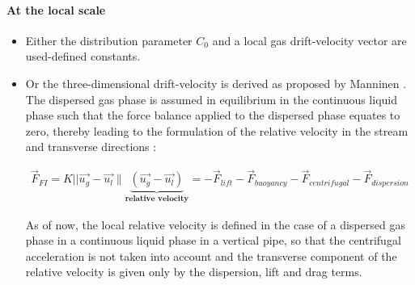 \paragraph{At the local scale} 
\begin{itemize}
	\item Either the distribution parameter $C_0$ and a local gas drift-velocity vector are used-defined constants. 
	\item Or the three-dimensional drift-velocity is derived as proposed by Manninen \cite{manninen1996mixture}. The dispersed gas phase  is assumed in equilibrium in the continuous liquid phase such that the force balance applied to the dispersed phase equates to zero, thereby leading to the formulation of the relative velocity in the stream and transverse directions :
	
	\begin{align}
		\overrightarrow{F}_{FI} = K ||\overrightarrow{u_g} - \overrightarrow{u_l}\rVert \underbrace{(\overrightarrow{u_g} - \overrightarrow{u_l})}_\textbf{relative velocity}  = - \overrightarrow{F}_{lift} - \overrightarrow{F}_{buoyancy} -\overrightarrow{F}_{centrifugal} -\overrightarrow{F}_{dispersion}
	\end{align}	 

As of now, the local relative velocity is defined in the case of a dispersed gas phase in a continuous liquid phase in a vertical pipe, so that the centrifugal acceleration is not taken into account and the transverse component of the relative velocity is given only by the dispersion, lift and drag terms.  

\end{itemize}


 


